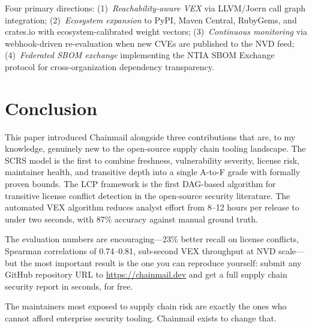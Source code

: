 \documentclass[11pt,twocolumn]{article}
\begin{document}
Four primary directions: (1)~\emph{Reachability-aware VEX} via LLVM/Joern call
graph integration; (2)~\emph{Ecosystem expansion} to PyPI, Maven Central,
RubyGems, and crates.io with ecosystem-calibrated weight vectors;
(3)~\emph{Continuous monitoring} via webhook-driven re-evaluation when new CVEs
are published to the NVD feed; (4)~\emph{Federated SBOM exchange} implementing
the NTIA SBOM Exchange protocol for cross-organization dependency transparency.

\section{Conclusion}

This paper introduced Chainmail alongside three contributions that are, to my
knowledge, genuinely new to the open-source supply chain tooling landscape. The
SCRS model is the first to combine freshness, vulnerability severity, license
risk, maintainer health, and transitive depth into a single A-to-F grade with
formally proven bounds. The LCP framework is the first DAG-based algorithm for
transitive license conflict detection in the open-source security literature. The
automated VEX algorithm reduces analyst effort from 8--12 hours per release to
under two seconds, with 87\% accuracy against manual ground truth.

The evaluation numbers are encouraging---23\% better recall on license conflicts,
Spearman correlations of 0.74--0.81, sub-second VEX throughput at NVD scale---but
the most important result is the one you can reproduce yourself: submit any GitHub
repository URL to \url{https://chainmail.dev} and get a full supply chain security
report in seconds, for free.

The maintainers most exposed to supply chain risk are exactly the ones who cannot
afford enterprise security tooling. Chainmail exists to change that.
\end{document}
